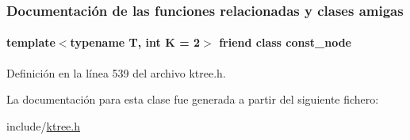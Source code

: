 \subsubsection{Documentación de las funciones relacionadas y clases amigas}
\paragraph[{\texorpdfstring{const\+\_\+node}{const_node}}]{\setlength{\rightskip}{0pt plus 5cm}template$<$typename T, int K = 2$>$ friend class {\bf const\+\_\+node}\hspace{0.3cm}{\ttfamily [friend]}}\hypertarget{classktree_1_1const__node_1_1child__iterator_a220f2e00de7b237254f2e2ba9dc0b635}{}\label{classktree_1_1const__node_1_1child__iterator_a220f2e00de7b237254f2e2ba9dc0b635}


Definición en la línea 539 del archivo ktree.\+h.



La documentación para esta clase fue generada a partir del siguiente fichero\+:\begin{DoxyCompactItemize}
\item 
include/\hyperlink{ktree_8h}{ktree.\+h}\end{DoxyCompactItemize}
